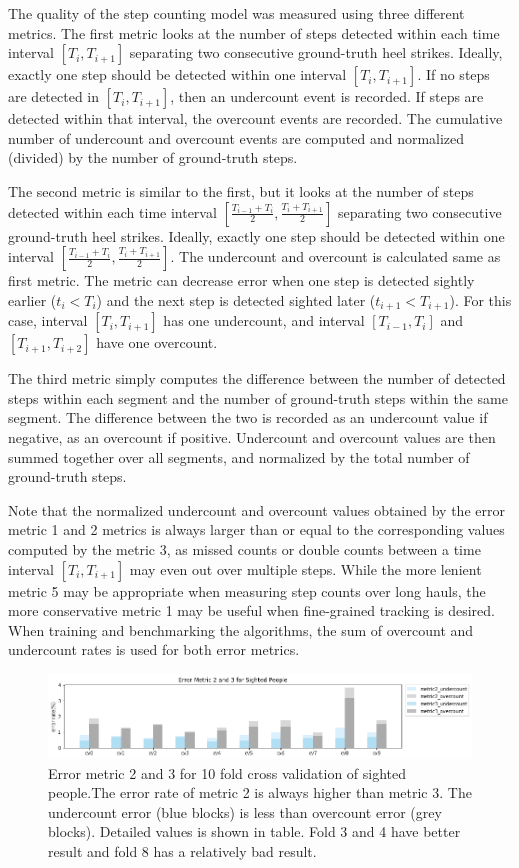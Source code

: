 \documentclass[11pt]{article}
\begin{document}
The quality of the step counting model was measured using three different metrics. The first metric looks at the number of steps detected within each time interval $[T_i, T_{i+1}]$ separating two consecutive ground-truth heel strikes. Ideally, exactly one step should be detected within one interval $[T_i, T_{i+1}]$. If no steps are detected in $[T_i, T_{i+1}]$, then an undercount event is recorded. If steps are detected within that interval, the overcount events are recorded. The cumulative number of undercount and overcount events are computed and normalized (divided) by the number of ground-truth steps.

The second metric is similar to the first,  but it looks at the number of steps detected within each time interval $[\frac{T_{i-1}+T_i}{2}, \frac{T_i+T_{i+1}}{2}]$ separating two consecutive ground-truth heel strikes. Ideally, exactly one step should be detected within one interval $[\frac{T_{i-1}+T_i}{2}, \frac{T_i+T_{i+1}}{2}]$. The undercount and overcount is calculated same as first metric. The metric can decrease error when one step is detected sightly earlier ($t_i<T_i$) and the next step is detected sighted later ($t_{i+1}<T_{i+1}$). For this case, interval $[T_i, T_{i+1}]$ has one undercount, and interval $[T_{i-1}, T_i]$ and $[T_{i+1}, T_{i+2}]$ have one overcount.

The third metric simply computes the difference between the number of detected steps within each segment and the number of ground-truth steps within the same segment. The difference between the two is recorded as an undercount value if negative, as an overcount if positive. Undercount and overcount values are then summed together over all segments, and normalized by the total number of ground-truth steps.

Note that the normalized undercount and overcount values obtained by the error metric 1 and 2 metrics is always larger than or equal to the corresponding values computed by the metric 3, as missed counts or double counts between a time interval $[T_i, T_{i+1}]$ may even out over multiple steps. While the more lenient metric 5 may be appropriate when measuring step counts over long hauls, the more conservative metric 1 may be useful when fine-grained tracking is desired. When training and benchmarking the algorithms, the sum of overcount and undercount rates is used for both error metrics.

\begin{figure}[ht]
\centering
\includegraphics[scale=0.5]{error_metric_23_na_10fold}
\caption{Error metric 2 and 3 for 10 fold cross validation of sighted people.The error rate of metric 2 is always higher than metric 3. The undercount error (blue blocks) is less than overcount error (grey blocks). Detailed values is shown in table. Fold 3 and 4 have better result and fold 8 has a relatively bad result.}
\label{fig:error_metric_23_na_10fold}
\end{figure}
\end{document}

